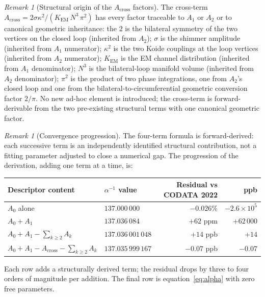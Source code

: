 \documentclass[11pt,a4paper]{article}
\theoremstyle{definition}
\theoremstyle{remark}
\newtheorem{remark}[theorem]{Remark}
\begin{document}
\begin{remark}[Structural origin of the $A_{\mathrm{cross}}$ factors]\label{rem:Across-factors}
The cross-term $A_{\mathrm{cross}} = 2\sigma\kappa^{2}/(K_{\mathrm{EM}}\,N^{3}\,\pi^{2})$ has every factor traceable to $A_{1}$ or $A_{2}$ or to canonical geometric inheritance: the $2$ is the bilateral symmetry of the two vertices on the closed loop (inherited from $A_{2}$); $\sigma$ is the shimmer amplitude (inherited from $A_{1}$ numerator); $\kappa^{2}$ is the two Koide couplings at the loop vertices (inherited from $A_{2}$ numerator); $K_{\mathrm{EM}}$ is the EM channel distribution (inherited from $A_{1}$ denominator); $N^{3}$ is the bilateral-loop manifold volume (inherited from $A_{2}$ denominator); $\pi^{2}$ is the product of two phase integrations, one from $A_{2}$'s closed loop and one from the bilateral-to-circumferential geometric conversion factor $2/\pi$. No new ad-hoc element is introduced; the cross-term is forward-derivable from the two pre-existing structural terms with one canonical geometric factor.
\end{remark}

\begin{remark}[Convergence progression]\label{rem:alpha-progression}
The four-term formula is forward-derived: each successive term is an independently identified structural contribution, not a fitting parameter adjusted to close a numerical gap. The progression of the derivation, adding one term at a time, is:
\begin{center}
\small
\begin{tabular}{@{}l l r r@{}}
\toprule
Descriptor content & $\alpha^{-1}$ value & Residual vs CODATA 2022 & ppb \\
\midrule
$A_{0}$ alone & $137.000\,000$ & $-0.026\%$ & $-2.6 \times 10^{5}$ \\
$A_{0} + A_{1}$ & $137.036\,084$ & $+62$ ppm & $+62\,000$ \\
$A_{0} + A_{1} - \textstyle\sum_{k \ge 2} A_{k}$ & $137.036\,001\,048$ & $+14$ ppb & $+14$ \\
$A_{0} + A_{1} - A_{\mathrm{cross}} - \textstyle\sum_{k \ge 2} A_{k}$ & $137.035\,999\,167$ & $-0.07$ ppb & $-0.07$ \\
\bottomrule
\end{tabular}
\end{center}
Each row adds a structurally derived term; the residual drops by three to four orders of magnitude per addition. The final row is equation~\eqref{eq:alpha} with zero free parameters.
\end{remark}
\end{document}
